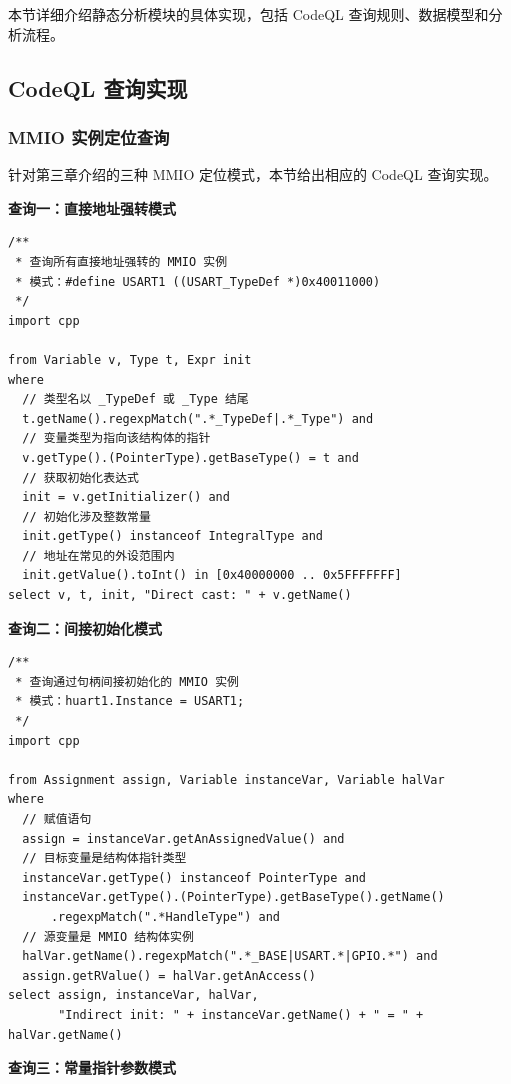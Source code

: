 本节详细介绍静态分析模块的具体实现，包括 CodeQL 查询规则、数据模型和分析流程。

\subsection{CodeQL 查询实现}

\subsubsection{MMIO 实例定位查询}

针对第三章介绍的三种 MMIO 定位模式，本节给出相应的 CodeQL 查询实现。

\textbf{查询一：直接地址强转模式}

\begin{lstlisting}[style=CStyle,abovecaptionskip=0pt,belowcaptionskip=0pt]
/**
 * 查询所有直接地址强转的 MMIO 实例
 * 模式：#define USART1 ((USART_TypeDef *)0x40011000)
 */
import cpp

from Variable v, Type t, Expr init
where
  // 类型名以 _TypeDef 或 _Type 结尾
  t.getName().regexpMatch(".*_TypeDef|.*_Type") and
  // 变量类型为指向该结构体的指针
  v.getType().(PointerType).getBaseType() = t and
  // 获取初始化表达式
  init = v.getInitializer() and
  // 初始化涉及整数常量
  init.getType() instanceof IntegralType and
  // 地址在常见的外设范围内
  init.getValue().toInt() in [0x40000000 .. 0x5FFFFFFF]
select v, t, init, "Direct cast: " + v.getName()
\end{lstlisting}

\textbf{查询二：间接初始化模式}

\begin{lstlisting}[style=CStyle,abovecaptionskip=0pt,belowcaptionskip=0pt]
/**
 * 查询通过句柄间接初始化的 MMIO 实例
 * 模式：huart1.Instance = USART1;
 */
import cpp

from Assignment assign, Variable instanceVar, Variable halVar
where
  // 赋值语句
  assign = instanceVar.getAnAssignedValue() and
  // 目标变量是结构体指针类型
  instanceVar.getType() instanceof PointerType and
  instanceVar.getType().(PointerType).getBaseType().getName()
      .regexpMatch(".*HandleType") and
  // 源变量是 MMIO 结构体实例
  halVar.getName().regexpMatch(".*_BASE|USART.*|GPIO.*") and
  assign.getRValue() = halVar.getAnAccess()
select assign, instanceVar, halVar,
       "Indirect init: " + instanceVar.getName() + " = " + halVar.getName()
\end{lstlisting}

\textbf{查询三：常量指针参数模式}

